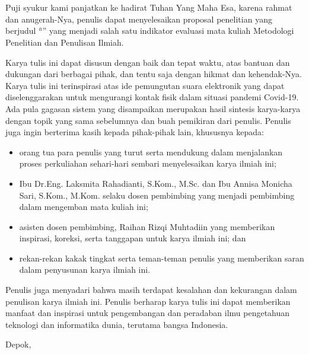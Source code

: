 \chapter*{\kataPengantar}

Puji syukur kami panjatkan ke hadirat Tuhan Yang Maha Esa, karena rahmat dan anugerah-Nya, penulis dapat menyelesaikan proposal penelitian yang berjudul “\f{\judul}” yang menjadi salah satu indikator evaluasi mata kuliah Metodologi Penelitian dan Penulisan Ilmiah.

Karya tulis ini dapat disusun dengan baik dan tepat waktu, atas bantuan dan dukungan dari berbagai pihak, dan tentu saja dengan hikmat dan kehendak-Nya. Karya tulis ini terinspirasi atas ide pemungutan suara elektronik yang dapat diselenggarakan untuk mengurangi kontak fisik dalam situasi pandemi Covid-19. Ada pula gagasan sistem yang disampaikan merupakan hasil sintesis karya-karya dengan topik yang sama sebelumnya dan buah pemikiran dari penulis. Penulis juga ingin berterima kasih kepada pihak-pihak lain, khususnya kepada:

\begin{itemize}
  \setlength\itemsep{0em}
    \item orang tua para penulis yang turut serta mendukung dalam menjalankan proses perkuliahan sehari-hari sembari menyelesaikan karya ilmiah ini;
    \item Ibu Dr.Eng. Laksmita Rahadianti, S.Kom., M.Sc. dan Ibu Annisa Monicha Sari, S.Kom., M.Kom. selaku dosen pembimbing yang menjadi pembimbing dalam mengemban mata kuliah ini;
    \item asisten dosen pembimbing, Raihan Rizqi Muhtadiin yang memberikan inspirasi, koreksi, serta tanggapan untuk karya ilmiah ini; dan
    \item rekan-rekan kakak tingkat serta teman-teman penulis yang memberikan saran dalam penyusunan karya ilmiah ini.
\end{itemize}

Penulis juga menyadari bahwa masih terdapat kesalahan dan kekurangan dalam penulisan karya ilmiah ini. Penulis berharap karya tulis ini dapat memberikan manfaat dan inspirasi untuk pengembangan dan peradaban ilmu pengetahuan teknologi dan informatika dunia, terutama bangsa Indonesia.

\vspace*{0.1cm}
\begin{flushright}
Depok, \tanggalSiapSidang\\[0.1cm]
\vspace*{1cm}
\penulis

\end{flushright}
